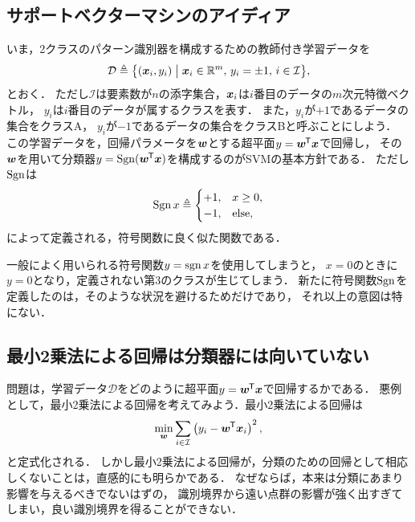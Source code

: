 %


\subsection{サポートベクターマシンのアイディア}

いま，2クラスのパターン識別器を構成するための教師付き学習データを
\begin{equation}
\mathcal{D} \triangleq \bigl\{
(\boldsymbol{x}_i, y_i) \bigm| \boldsymbol{x}_i \in \mathbb{R}^m, \, y_i = \pm 1, \, i \in
\mathcal{I} \bigr\},
\end{equation}
とおく．
ただし$\mathcal{I}$は要素数が$n$の添字集合，$\boldsymbol{x}_i$は$i$番目のデータの$m$次元特徴ベクトル，
$y_i$は$i$番目のデータが属するクラスを表す．
また，$y_i$が$+1$であるデータの集合をクラスA，
$y_i$が$-1$であるデータの集合をクラスBと呼ぶことにしよう．
この学習データを，回帰パラメータを$\boldsymbol{w}$とする超平面$y = \boldsymbol{w}^{\mkern-1.5mu\mathsf{T}}\boldsymbol{x}$で回帰し，
その$\boldsymbol{w}$を用いて分類器$y = \operatorname*{Sgn}(\boldsymbol{w}^{\mkern-1.5mu\mathsf{T}}\boldsymbol{x})$を構成するのがSVMの基本方針である．
ただし$\operatorname*{Sgn}$は
\begin{equation}
\operatorname*{Sgn} x \triangleq
\begin{cases}
+1, & x \geq 0,    \\
-1, & \text{else}, \\
\end{cases}
\end{equation}
によって定義される，符号関数に良く似た関数である．
\begin{note}
一般によく用いられる符号関数$y = \operatorname*{sgn} x$を使用してしまうと，
$x = 0$のときに$y = 0$となり，定義されない第3のクラスが生じてしまう．
新たに符号関数$\operatorname*{Sgn}$を定義したのは，そのような状況を避けるためだけであり，
それ以上の意図は特にない．
\end{note}


\subsection{最小2乗法による回帰は分類器には向いていない}

問題は，学習データ$\mathcal{D}$をどのように超平面$y = \boldsymbol{w}^{\mkern-1.5mu\mathsf{T}}\boldsymbol{x}$で回帰するかである．
悪例として，最小2乗法による回帰を考えてみよう．最小2乗法による回帰は
\begin{equation}
\min_{\boldsymbol{w}} \sum_{i \in \mathcal{I}}
\left( y_i - \boldsymbol{w}^{\mkern-1.5mu\mathsf{T}}\boldsymbol{x}_i \right)^2,
\end{equation}
と定式化される．
しかし最小2乗法による回帰が，分類のための回帰として相応しくないことは，直感的にも明らかである．
なぜならば，本来は分類にあまり影響を与えるべきでないはずの，
識別境界から遠い点群の影響が強く出すぎてしまい，良い識別境界を得ることができない．


